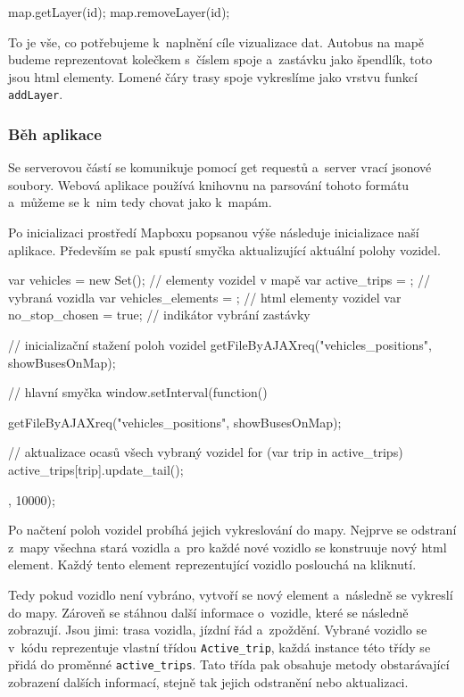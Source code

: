 \begin{code}[frame=none]
map.getLayer(id);
map.removeLayer(id);
\end{code}


To je vše, co potřebujeme k~naplnění cíle vizualizace dat. Autobus na mapě budeme reprezentovat kolečkem s~číslem spoje a~zastávku jako špendlík, toto jsou \gls{html} elementy. Lomené čáry trasy spoje vykreslíme jako vrstvu funkcí \verb-addLayer-.


\subsubsection{Běh aplikace}


Se serverovou částí se komunikuje pomocí get requestů a~server vrací \gls{json}ové soubory. Webová aplikace používá knihovnu na parsování tohoto formátu a~můžeme se k~nim tedy chovat jako k~mapám.


\bigbreak

Po inicializaci prostředí Mapboxu popsanou výše následuje inicializace naší aplikace. Především se pak spustí smyčka aktualizující aktuální polohy vozidel.


\begin{code}[frame=none]
var vehicles = new Set(); // elementy vozidel v mapě
var active_trips = {}; // vybraná vozidla
var vehicles_elements = {}; // html elementy vozidel
var no_stop_chosen = true; // indikátor vybrání zastávky


// inicializační stažení poloh vozidel
getFileByAJAXreq("vehicles_positions", showBusesOnMap);


// hlavní smyčka
window.setInterval(function(){
getFileByAJAXreq("vehicles_positions", showBusesOnMap);


// aktualizace ocasů všech vybraný vozidel
for (var trip in active_trips){
  active_trips[trip].update_tail();
}
}, 10000);
\end{code}


Po načtení poloh vozidel probíhá jejich vykreslování do mapy. Nejprve se odstraní z~mapy všechna stará vozidla a~pro každé nové vozidlo se konstruuje nový \gls{html} element. Každý tento element reprezentující vozidlo poslouchá na kliknutí.


\bigbreak


Tedy pokud vozidlo není vybráno, vytvoří se nový element a~následně se vykreslí do mapy. Zároveň se stáhnou další informace o~vozidle, které se následně zobrazují. Jsou jimi: trasa vozidla, jízdní řád a~zpoždění. Vybrané vozidlo se v~kódu reprezentuje vlastní třídou \verb-Active_trip-, každá instance této třídy se přidá do proměnné \verb-active_trips-. Tato třída pak obsahuje metody obstarávající zobrazení dalších informací, stejně tak jejich odstranění nebo aktualizaci.


